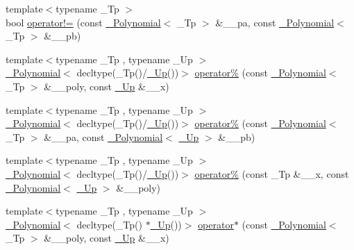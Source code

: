 \begin{DoxyCompactItemize}
\item 
{\footnotesize template$<$typename \+\_\+\+Tp $>$ }\\bool \hyperlink{namespace____gnu__cxx_a1279934a2d6df66704c6eab9113b0f97}{operator!=} (const \hyperlink{class____gnu__cxx_1_1__Polynomial}{\+\_\+\+Polynomial}$<$ \+\_\+\+Tp $>$ \&\+\_\+\+\_\+pa, const \hyperlink{class____gnu__cxx_1_1__Polynomial}{\+\_\+\+Polynomial}$<$ \+\_\+\+Tp $>$ \&\+\_\+\+\_\+pb)
\item 
{\footnotesize template$<$typename \+\_\+\+Tp , typename \+\_\+\+Up $>$ }\\\hyperlink{class____gnu__cxx_1_1__Polynomial}{\+\_\+\+Polynomial}$<$ decltype(\+\_\+\+Tp()/\hyperlink{namespace____gnu__cxx_ab693ea357b6429b331e0bf09f9442385}{\+\_\+\+Up}())$>$ \hyperlink{namespace____gnu__cxx_a3132828069a740986e97f1db8e07325c}{operator\%} (const \hyperlink{class____gnu__cxx_1_1__Polynomial}{\+\_\+\+Polynomial}$<$ \+\_\+\+Tp $>$ \&\+\_\+\+\_\+poly, const \hyperlink{namespace____gnu__cxx_ab693ea357b6429b331e0bf09f9442385}{\+\_\+\+Up} \&\+\_\+\+\_\+x)
\item 
{\footnotesize template$<$typename \+\_\+\+Tp , typename \+\_\+\+Up $>$ }\\\hyperlink{class____gnu__cxx_1_1__Polynomial}{\+\_\+\+Polynomial}$<$ decltype(\+\_\+\+Tp()/\hyperlink{namespace____gnu__cxx_ab693ea357b6429b331e0bf09f9442385}{\+\_\+\+Up}())$>$ \hyperlink{namespace____gnu__cxx_a13dae497264694313717a5aa70407de5}{operator\%} (const \hyperlink{class____gnu__cxx_1_1__Polynomial}{\+\_\+\+Polynomial}$<$ \+\_\+\+Tp $>$ \&\+\_\+\+\_\+pa, const \hyperlink{class____gnu__cxx_1_1__Polynomial}{\+\_\+\+Polynomial}$<$ \hyperlink{namespace____gnu__cxx_ab693ea357b6429b331e0bf09f9442385}{\+\_\+\+Up} $>$ \&\+\_\+\+\_\+pb)
\item 
{\footnotesize template$<$typename \+\_\+\+Tp , typename \+\_\+\+Up $>$ }\\\hyperlink{class____gnu__cxx_1_1__Polynomial}{\+\_\+\+Polynomial}$<$ decltype(\+\_\+\+Tp()/\hyperlink{namespace____gnu__cxx_ab693ea357b6429b331e0bf09f9442385}{\+\_\+\+Up}())$>$ \hyperlink{namespace____gnu__cxx_a2d1e6cb96943b2c99f71cf77a7247e77}{operator\%} (const \+\_\+\+Tp \&\+\_\+\+\_\+x, const \hyperlink{class____gnu__cxx_1_1__Polynomial}{\+\_\+\+Polynomial}$<$ \hyperlink{namespace____gnu__cxx_ab693ea357b6429b331e0bf09f9442385}{\+\_\+\+Up} $>$ \&\+\_\+\+\_\+poly)
\item 
{\footnotesize template$<$typename \+\_\+\+Tp , typename \+\_\+\+Up $>$ }\\\hyperlink{class____gnu__cxx_1_1__Polynomial}{\+\_\+\+Polynomial}$<$ decltype(\+\_\+\+Tp() $\ast$\hyperlink{namespace____gnu__cxx_ab693ea357b6429b331e0bf09f9442385}{\+\_\+\+Up}())$>$ \hyperlink{namespace____gnu__cxx_a1d0b1e9322fd407848b43cecab1ab9ae}{operator$\ast$} (const \hyperlink{class____gnu__cxx_1_1__Polynomial}{\+\_\+\+Polynomial}$<$ \+\_\+\+Tp $>$ \&\+\_\+\+\_\+poly, const \hyperlink{namespace____gnu__cxx_ab693ea357b6429b331e0bf09f9442385}{\+\_\+\+Up} \&\+\_\+\+\_\+x)

\end{DoxyCompactItemize}
